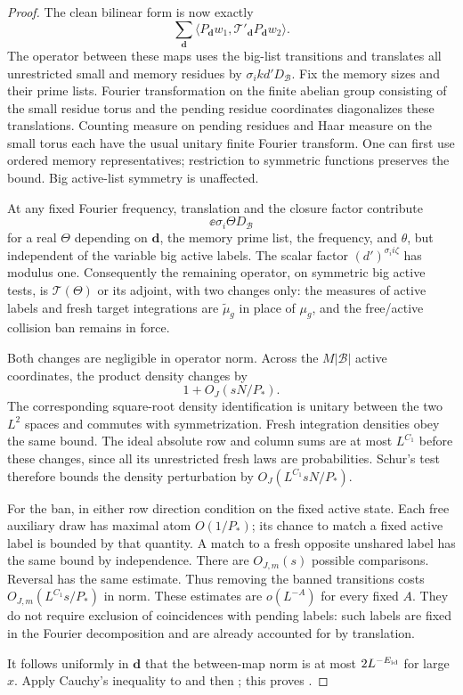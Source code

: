 \begin{proof}
The clean bilinear form is now exactly
\begin{equation}\label{eq:clean-conditioned-form}
 \sum_{\mathbf d}
 \langle P_{\mathbf d}w_1,
                \mathcal T'_{\mathbf d}P_{\mathbf d}w_2\rangle.
\end{equation}
The operator between these maps uses the big-list transitions
and translates all unrestricted small and memory residues
by $\sigma_i kd'D_{\mathcal B}$.  Fix the memory sizes and
their prime lists.  Fourier transformation on the finite
abelian group consisting of the small residue torus and
the pending residue coordinates diagonalizes these
translations.  Counting measure on pending residues and
Haar measure on the small torus each have the usual unitary
finite Fourier transform.  One can first use ordered memory
representatives; restriction to symmetric functions preserves
the bound.  Big active-list symmetry is unaffected.

At any fixed Fourier frequency, translation and the closure
factor contribute
\[
 \ee{\sigma_i\Theta D_{\mathcal B}}
\]
for a real $\Theta$ depending on $\mathbf d$, the memory
prime list, the frequency, and $\theta$, but independent
of the variable big active labels.  The scalar factor
$(d')^{\sigma_i i\zeta}$ has modulus one.  Consequently
the remaining operator, on symmetric big active tests, is
$\mathcal T(\Theta)$ or its adjoint, with two changes only:
the measures of active labels and fresh target integrations
are $\widetilde\mu_g$ in place of $\mu_g$, and the
free/active collision ban remains in force.

Both changes are negligible in operator norm.  Across the
$M|\mathcal B|$ active coordinates, the product density
changes by
\[
 1+O_J(sN/P_*).
\]
The corresponding square-root density identification is
unitary between the two $L^2$ spaces and commutes with
symmetrization.  Fresh integration densities obey the
same bound.  The ideal absolute row and column sums are
at most $L^{C_1}$ before these changes, since all its
unrestricted fresh laws are probabilities.  Schur's test
therefore bounds the density perturbation by
$O_J(L^{C_1}sN/P_*)$.

For the ban, in either row direction condition on the
fixed active state.  Each free auxiliary draw has maximal
atom $O(1/P_*)$; its chance to match a fixed active label
is bounded by that quantity.  A match to a fresh opposite
unshared label has the same bound by independence.
There are $O_{J,m}(s)$ possible comparisons.  Reversal
has the same estimate.  Thus removing the banned
transitions costs $O_{J,m}(L^{C_1}s/P_*)$ in norm.
These estimates are $o(L^{-A})$ for every fixed $A$.
They do not require exclusion of coincidences with
pending labels: such labels are fixed in the Fourier
decomposition and are already accounted for by translation.

It follows uniformly in $\mathbf d$ that the between-map
norm is at most $2L^{-E_{\rm id}}$ for large $x$.  Apply
Cauchy's inequality to 
and then ; this proves
.
\end{proof}

